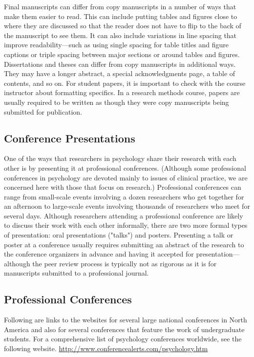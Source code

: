Final manuscripts can differ from copy manuscripts in a number of ways that make them easier to read. This can include putting tables and figures close to where they are discussed so that the reader does not have to flip to the back of the manuscript to see them. It can also include variations in line spacing that improve readability---such as using single spacing for table titles and figure captions or triple spacing between major sections or around tables and figures. Dissertations and theses can differ from copy manuscripts in additional ways. They may have a longer abstract, a special acknowledgments page, a table of contents, and so on. For student papers, it is important to check with the course instructor about formatting specifics. In a research methods course, papers are usually required to be written as though they were copy manuscripts being submitted for publication.


\subsection{Conference Presentations}

One of the ways that researchers in psychology share their research with each other is by presenting it at professional conferences. (Although some professional conferences in psychology are devoted mainly to issues of clinical practice, we are concerned here with those that focus on research.) Professional conferences can range from small-scale events involving a dozen researchers who get together for an afternoon to large-scale events involving thousands of researchers who meet for several days. Although researchers attending a professional conference are likely to discuss their work with each other informally, there are two more formal types of presentation: oral presentations ("talks") and posters. Presenting a talk or poster at a conference usually requires submitting an abstract of the research to the conference organizers in advance and having it accepted for presentation---although the peer review process is typically not as rigorous as it is for manuscripts submitted to a professional journal.


\subsection{Professional Conferences}

Following are links to the websites for several large national conferences in North America and also for several conferences that feature the work of undergraduate students. For a comprehensive list of psychology conferences worldwide, see the following website.
\url{http://www.conferencealerts.com/psychology.htm}

